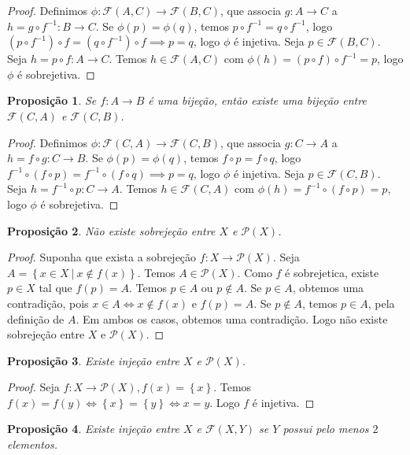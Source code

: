 \documentclass{article}
\theoremstyle{plain}
\newtheorem{prop}{Proposição}[section]
\theoremstyle{definition}
\theoremstyle{remark}
\begin{document}
\begin{proof}
	Definimos $\phi : \mathcal{F}(A, C) \to \mathcal{F}(B, C)$, que associa $g:A\to C$ a $h = g\circ f^{-1} :B\to C   $.  Se $\phi(p) = \phi(q)$, temos $p\circ f^{-1} = q \circ f^{-1}$, logo $(p\circ f^{-1} ) \circ f = (q\circ f^{-1})\circ f \implies p = q$, logo $\phi$ é injetiva. Seja $p \in \mathcal{F}(B,C)$. Seja $h = p\circ f : A\to C$. Temos $h\in \mathcal{F}(A,C)$ com $\phi(h) = (p\circ f)\circ f^{-1} = p$, logo $\phi$ é sobrejetiva.
\end{proof}
\begin{prop}
	Se $f:A\to B$ é uma bijeção, então existe uma bijeção entre $\mathcal{F}(C, A)$ e $\mathcal{F}(C,B)$.
\end{prop}
\begin{proof}
	Definimos $\phi : \mathcal{F}(C, A) \to \mathcal{F}(C, B)$, que associa $g:C\to A$ a $h = f\circ g :C\to B   $.  Se $\phi(p) = \phi(q)$, temos $f\circ p  = f\circ q $, logo $f^{-1} \circ (f\circ p ) = f^{-1} \circ (f\circ q )  \implies p = q$, logo $\phi$ é injetiva. Seja $p \in \mathcal{F}(C,B)$. Seja $h = f^{-1} \circ p  : C\to A$. Temos $h\in \mathcal{F}(C,A)$ com $\phi(h) = f^{-1} \circ (f\circ p)  = p$, logo $\phi$ é sobrejetiva.
\end{proof}
\begin{prop}
	Não existe sobrejeção entre $X$ e $\mathcal{P}( X)$.
\end{prop}
\begin{proof}
	Suponha que exista a sobrejeção $f: X \to \mathcal{P}(X)$. Seja $A = \left\{ x \in X \: | \: x\not\in f(x) \right\}$. Temos $A\in \mathcal{P}(X)$. Como $f$ é sobrejetica, existe $p\in X$ tal que $f(p) = A$.  Temos $p\in A$ ou $p\not \in A$. Se $p\in A$, obtemos uma contradição, pois $x \in A \iff x \not \in f(x)$ e $f(p) = A$. Se $p\not \in A$, temos $p\in A$, pela definição  de $A$. Em ambos os casos, obtemos uma contradição. Logo não existe sobrejeção entre $X$ e $\mathcal{P}(X)$.
\end{proof}
\begin{prop}
	Existe injeção entre $X$ e $\mathcal{P}( X)$.
\end{prop}
\begin{proof}
	Seja $f: X\to \mathcal{P}(X), f(x) = \left\{x\right\}$. Temos $f(x) = f(y) \iff \left\{ x\right\} = \left\{y\right\}  \iff x = y$. Logo $f$ é injetiva.
\end{proof}
\begin{prop}
	Existe injeção entre $X$ e $\mathcal{F}(X,Y)$ se $Y$ possui pelo menos $2$ elementos.
\end{prop}
\end{document}
